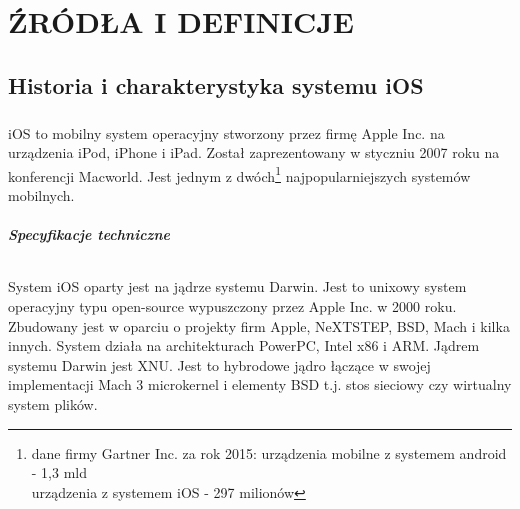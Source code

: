 \documentclass[12pt,oneside,a4paper]{report}
\begin{document}
\chapter{ŹRÓDŁA I DEFINICJE}
\section{Historia i charakterystyka systemu iOS}
\paragraph{}iOS to mobilny system operacyjny stworzony przez firmę Apple Inc. na urządzenia iPod, iPhone i iPad. Został zaprezentowany w styczniu 2007 roku na konferencji Macworld. Jest jednym z dwóch\footnote{dane firmy Gartner Inc. za rok 2015: urządzenia mobilne z systemem android - 1,3 mld \\ urządzenia z systemem iOS - 297 milionów} najpopularniejszych systemów mobilnych. 
\paragraph{Specyfikacje techniczne}
\subparagraph{}System iOS oparty jest na jądrze systemu Darwin. Jest to unixowy system operacyjny typu open-source wypuszczony przez Apple Inc. w 2000 roku. Zbudowany jest w oparciu o projekty firm Apple, NeXTSTEP, BSD, Mach i kilka innych. System działa na architekturach PowerPC, Intel x86 i ARM.\cite{pureDarwin}\cite{openGroup} 
Jądrem systemu Darwin jest XNU. Jest to hybrodowe jądro łączące w swojej implementacji Mach 3 microkernel i elementy BSD t.j. stos sieciowy czy wirtualny system plików.\cite{XNUkernel}
\end{document}
